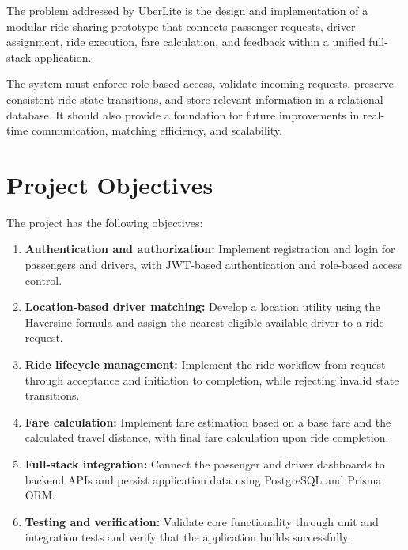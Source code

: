 \documentclass{tietreport}
\begin{document}
The problem addressed by UberLite is the design and implementation
of a modular ride-sharing prototype that connects passenger requests,
driver assignment, ride execution, fare calculation, and feedback
within a unified full-stack application.

The system must enforce role-based access, validate incoming
requests, preserve consistent ride-state transitions, and store
relevant information in a relational database. It should also provide
a foundation for future improvements in real-time communication,
matching efficiency, and scalability.

\section{Project Objectives}

The project has the following objectives:

\begin{enumerate}
    \item \textbf{Authentication and authorization:}
    Implement registration and login for passengers and drivers,
    with JWT-based authentication and role-based access control.

    \item \textbf{Location-based driver matching:}
    Develop a location utility using the Haversine formula and
    assign the nearest eligible available driver to a ride request.

    \item \textbf{Ride lifecycle management:}
    Implement the ride workflow from request through acceptance
    and initiation to completion, while rejecting invalid
    state transitions.

    \item \textbf{Fare calculation:}
    Implement fare estimation based on a base fare and the
    calculated travel distance, with final fare calculation
    upon ride completion.

    \item \textbf{Full-stack integration:}
    Connect the passenger and driver dashboards to backend APIs
    and persist application data using PostgreSQL and Prisma ORM.

    \item \textbf{Testing and verification:}
    Validate core functionality through unit and integration
    tests and verify that the application builds successfully.
\end{enumerate}
\end{document}
